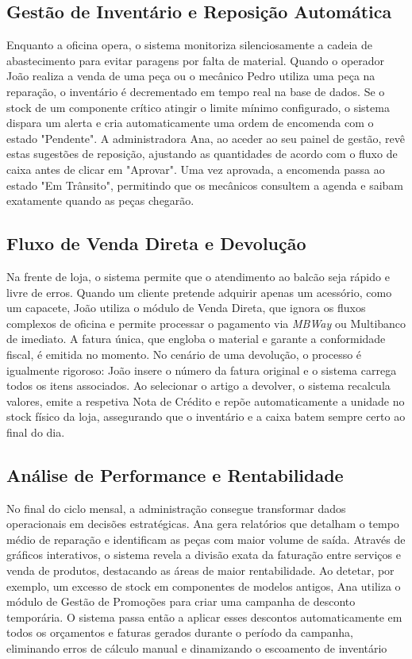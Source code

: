 \documentclass[a4paper,12pt]{scrreprt}
\begin{document}
\subsection{Gestão de Inventário e Reposição Automática}
Enquanto a oficina opera, o sistema monitoriza silenciosamente a cadeia de abastecimento para evitar paragens por falta de material. Quando o operador João realiza a venda de uma peça ou o mecânico Pedro utiliza uma peça na reparação, o inventário é decrementado em tempo real na base de dados. Se o stock de um componente crítico atingir o limite mínimo configurado, o sistema dispara um alerta e cria automaticamente uma ordem de encomenda com o estado "Pendente". A administradora Ana, ao aceder ao seu painel de gestão, revê estas sugestões de reposição, ajustando as quantidades de acordo com o fluxo de caixa antes de clicar em "Aprovar". Uma vez aprovada, a encomenda passa ao estado "Em Trânsito", permitindo que os mecânicos consultem a agenda e saibam exatamente quando as peças chegarão. 

\subsection{Fluxo de Venda Direta e Devolução}
Na frente de loja, o sistema permite que o atendimento ao balcão seja rápido e livre de erros. Quando um cliente pretende adquirir apenas um acessório, como um capacete, João utiliza o módulo de Venda Direta, que ignora os fluxos complexos de oficina e permite processar o pagamento via \textit{MBWay }ou Multibanco de imediato. A fatura única, que engloba o material e garante a conformidade fiscal, é emitida no momento. No cenário de uma devolução, o processo é igualmente rigoroso: João insere o número da fatura original e o sistema carrega todos os itens associados. Ao selecionar o artigo a devolver, o sistema recalcula valores, emite a respetiva Nota de Crédito e repõe automaticamente a unidade no stock físico da loja, assegurando que o inventário e a caixa batem sempre certo ao final do dia. 

\subsection{Análise de Performance e Rentabilidade}
No final do ciclo mensal, a administração consegue transformar dados operacionais em decisões estratégicas. Ana gera relatórios que detalham o tempo médio de reparação e identificam as peças com maior volume de saída. Através de gráficos interativos, o sistema revela a divisão exata da faturação entre serviços e venda de produtos, destacando as áreas de maior rentabilidade. Ao detetar, por exemplo, um excesso de stock em componentes de modelos antigos, Ana utiliza o módulo de Gestão de Promoções para criar uma campanha de desconto temporária. O sistema passa então a aplicar esses descontos automaticamente em todos os orçamentos e faturas gerados durante o período da campanha, eliminando erros de cálculo manual e dinamizando o escoamento de inventário
\end{document}
